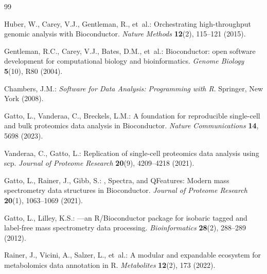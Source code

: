 \documentclass[11pt,twoside,openright]{book}
\begin{document}
\begin{thebibliography}{99}

Huber, W., Carey, V.J., Gentleman, R., et~al.:
\newblock Orchestrating high-throughput genomic analysis with {Bioconductor}.
\newblock \emph{Nature Methods} \textbf{12}(2), 115--121 (2015).
\newblock {}

Gentleman, R.C., Carey, V.J., Bates, D.M., et~al.:
\newblock Bioconductor: open software development for computational biology and bioinformatics.
\newblock \emph{Genome Biology} \textbf{5}(10), R80 (2004).
\newblock {}

Chambers, J.M.:
\newblock \emph{Software for Data Analysis: Programming with R}.
\newblock Springer, New York (2008).
\newblock {}

Gatto, L., Vanderaa, C., Breckels, L.M.:
\newblock A foundation for reproducible single-cell and bulk proteomics data analysis in {Bioconductor}.
\newblock \emph{Nature Communications} \textbf{14}, 5698 (2023).
\newblock {}

Vanderaa, C., Gatto, L.:
\newblock Replication of single-cell proteomics data analysis using scp.
\newblock \emph{Journal of Proteome Research} \textbf{20}(9), 4209--4218 (2021).
\newblock {}

Gatto, L., Rainer, J., Gibb, S.:
, {Spectra}, and {QFeatures}: Modern mass spectrometry data structures in {Bioconductor}.
\newblock \emph{Journal of Proteome Research} \textbf{20}(1), 1063--1069 (2021).
\newblock {}

Gatto, L., Lilley, K.S.:
---an {R/Bioconductor} package for isobaric tagged and label-free mass spectrometry data processing.
\newblock \emph{Bioinformatics} \textbf{28}(2), 288--289 (2012).
\newblock {}

Rainer, J., Vicini, A., Salzer, L., et~al.:
\newblock A modular and expandable ecosystem for metabolomics data annotation in {R}.
\newblock \emph{Metabolites} \textbf{12}(2), 173 (2022).
\newblock {}


\end{thebibliography}
\end{document}
